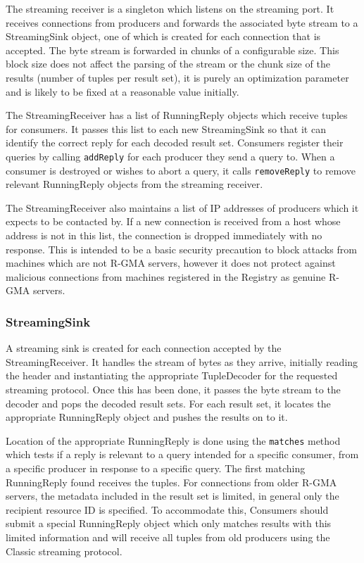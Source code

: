 The streaming receiver is a singleton which listens on the streaming
port. It receives connections from producers and forwards the associated byte
stream to a StreamingSink object, one of which is created for each connection that
is accepted. The byte stream is forwarded in chunks of a configurable size. This block
size does not affect the parsing of the stream or the chunk size of the results (number
of tuples per result set), it is purely an optimization parameter and is likely to be
fixed at a reasonable value initially.

The StreamingReceiver has a list of RunningReply objects which receive tuples for
consumers. It passes this list to each new StreamingSink so that it can identify
the correct reply for each decoded result set. Consumers register their queries
by calling \texttt{addReply} for each producer they send a query to. When a consumer is
destroyed or wishes to abort a query, it calls \texttt{removeReply} to remove relevant
RunningReply objects from the streaming receiver.

The StreamingReceiver also maintains a list of IP addresses of producers which
it expects to be contacted by. If a new connection is received from a host whose
address is not in this list, the connection is dropped immediately with no response.
This is intended to be a basic security precaution to block attacks from machines which
are not R-GMA servers, however it does not protect against malicious connections from
machines registered in the Registry as genuine R-GMA servers.



\subsubsection*{StreamingSink}



A streaming sink is created for each connection accepted by the StreamingReceiver.
It handles the stream of bytes as they arrive, initially reading the header
and instantiating the appropriate TupleDecoder for the requested streaming protocol.
Once this has been done, it passes the byte stream to the decoder and pops the
decoded result sets. For each result set, it locates the appropriate RunningReply
object and pushes the results on to it.

Location of the appropriate RunningReply is done using the \texttt{matches} method
which tests if a reply is relevant to a query intended for a specific consumer, from
a specific producer in response to a specific query. The first matching RunningReply
found receives the tuples. For connections from older R-GMA servers, the metadata 
included in the result set is limited, in general only the recipient resource ID is 
specified. To accommodate this, Consumers should submit a special RunningReply object
which only matches results with this limited information and will receive all tuples
from old producers using the Classic streaming protocol.

